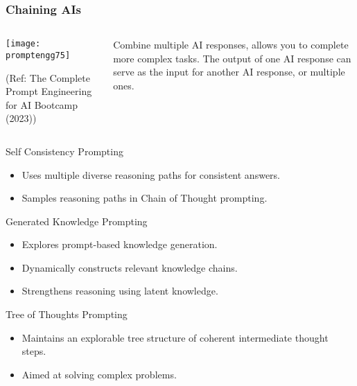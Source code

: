 \begin{frame}[fragile]\frametitle{Chaining AIs}

\begin{columns}
    \begin{column}[T]{0.6\linewidth}
		\begin{center}
		\texttt{[image: promptengg75]}

		{\tiny (Ref: The Complete Prompt Engineering for AI Bootcamp (2023))}
		\end{center}	
    \end{column}
    \begin{column}[T]{0.4\linewidth}
		Combine multiple AI responses, allows you to complete more complex tasks.
		The output of one AI response can serve as the input for another AI response, or multiple ones.
    \end{column}
  \end{columns}
\end{frame}


\begin{frame}[fragile]{Self Consistency Prompting}
    \begin{itemize}
        \item Uses multiple diverse reasoning paths for consistent answers.
        \item Samples reasoning paths in Chain of Thought prompting.
    \end{itemize}
\end{frame}

\begin{frame}[fragile]{Generated Knowledge Prompting}
    \begin{itemize}
        \item Explores prompt-based knowledge generation.
        \item Dynamically constructs relevant knowledge chains.
        \item Strengthens reasoning using latent knowledge.
    \end{itemize}
\end{frame}

\begin{frame}[fragile]{Tree of Thoughts Prompting}
    \begin{itemize}
        \item Maintains an explorable tree structure of coherent intermediate thought steps.
        \item Aimed at solving complex problems.
    \end{itemize}
\end{frame}

